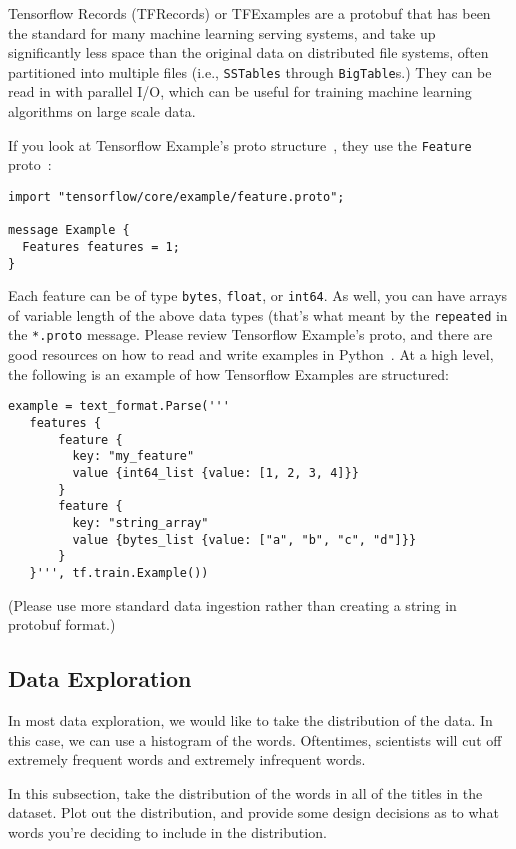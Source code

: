 \documentclass[paper=a4, fontsize=11pt]{scrartcl} %
\begin{document}
Tensorflow Records (TFRecords) or TFExamples are a protobuf that has been the standard for many machine learning serving systems, and take up significantly less space than the original data on distributed file systems, often partitioned into multiple files (i.e., \verb"SSTables" through \verb"BigTable"s.) They can be read in with parallel I/O, which can be useful for training machine learning algorithms on large scale data.

If you look at Tensorflow Example's proto structure~\cite{tfproto}, they use the \verb"Feature" proto~\cite{tffeat}:

\begin{verbatim}
import "tensorflow/core/example/feature.proto";

message Example {
  Features features = 1;
}
\end{verbatim}

Each feature can be of type \verb"bytes", \verb"float", or \verb"int64". As well, you can have arrays of variable length of the above data types (that's what meant by the \verb"repeated" in the \verb"*.proto" message. Please review Tensorflow Example's proto, and there are good resources on how to read and write examples in Python~\cite{tfcodex}. At a high level, the following is an example of how Tensorflow Examples are structured:

\begin{verbatim}
example = text_format.Parse('''
   features {
       feature {
         key: "my_feature"
         value {int64_list {value: [1, 2, 3, 4]}}
       }
       feature {
         key: "string_array"
         value {bytes_list {value: ["a", "b", "c", "d"]}}
       }
   }''', tf.train.Example())
\end{verbatim}

(Please use more standard data ingestion rather than creating a string in protobuf format.)

\subsection{Data Exploration}

In most data exploration, we would like to take the distribution of the data. In this case, we can use a histogram of the words. Oftentimes, scientists will cut off extremely frequent words and extremely infrequent words.

In this subsection, take the distribution of the words in all of the titles in the dataset. Plot out the distribution, and provide some design decisions as to what words you're deciding to include in the distribution.
\end{document}
